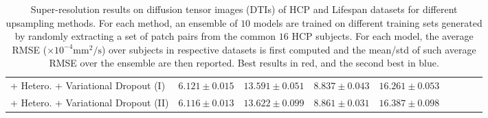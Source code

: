 \begin{table}
\begin{tabular}{@{}lclclclcl}
		+ Hetero. + Variational Dropout (I)   & \cellcolor{blue!15} $6.121\pm0.015$    &$13.591\pm0.051$   & \cellcolor{red!15} $8.837\pm0.043$ &$16.261\pm0.053$\\ 
		+ Hetero. + Variational Dropout (II)  & \cellcolor{red!15} $6.116\pm0.013$   &$13.622\pm0.099$   & \cellcolor{blue!15} $8.861\pm0.031$  &$16.387\pm0.098$\\
		\hline
	\end{tabular}%
	\vspace{-1mm}
\caption{\footnotesize Super-resolution results on diffusion tensor images (DTIs) of HCP and Lifespan datasets for different upsampling methods. For each method, an ensemble of $10$ models are trained on different training sets generated by randomly extracting a set of patch pairs from the common $16$ HCP subjects. For each model, the average RMSE ($\times 10^{-4} \text{mm}^2/\text{s} $) over subjects in respective datasets is first computed and the mean/std of such average RMSE over the ensemble are then reported. Best results in red, and the second best in blue. }
\label{tab:compare_1}	
\end{table}


